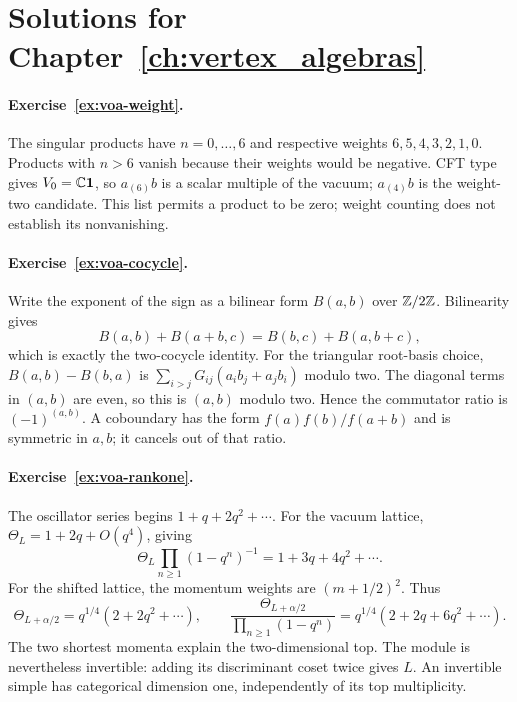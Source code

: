 \section{Solutions for Chapter~\ref{ch:vertex_algebras}}

\paragraph{Exercise~\ref{ex:voa-weight}.}
\label{sol:ex:voa-weight}
The singular products have $n=0,\ldots,6$ and respective weights
$6,5,4,3,2,1,0$. Products with $n>6$ vanish because their
weights would be negative. CFT type gives $V_0=\mathbb C\mathbf1$,
so $a_{(6)}b$ is a scalar multiple of the vacuum; $a_{(4)}b$
is the weight-two candidate. This list permits a product to be
zero; weight counting does not establish its nonvanishing.



\paragraph{Exercise~\ref{ex:voa-cocycle}.}
\label{sol:ex:voa-cocycle}
Write the exponent of the sign as a bilinear form $B(a,b)$
over $\mathbb Z/2\mathbb Z$. Bilinearity gives
\[
 B(a,b)+B(a+b,c)=B(b,c)+B(a,b+c),
\]
which is exactly the two-cocycle identity. For the triangular
root-basis choice, $B(a,b)-B(b,a)$ is
$\sum_{i>j}G_{ij}(a_ib_j+a_jb_i)$ modulo two.
The diagonal terms in $(a,b)$ are even, so this is $(a,b)$
modulo two. Hence the commutator ratio is $(-1)^{(a,b)}$.
A coboundary has the form
$f(a)f(b)/f(a+b)$ and is symmetric in $a,b$; it cancels
out of that ratio.



\paragraph{Exercise~\ref{ex:voa-rankone}.}
\label{sol:ex:voa-rankone}
The oscillator series begins $1+q+2q^2+\cdots$.
For the vacuum lattice, $\Theta_L=1+2q+O(q^4)$, giving
\[
 \Theta_L\prod_{n\ge1}(1-q^n)^{-1}=1+3q+4q^2+\cdots.
\]
For the shifted lattice, the momentum weights are
$(m+1/2)^2$. Thus
\[
 \Theta_{L+\alpha/2}=q^{1/4}(2+2q^2+\cdots),\qquad
 \frac{\Theta_{L+\alpha/2}}{\prod_{n\ge1}(1-q^n)}
 =q^{1/4}(2+2q+6q^2+\cdots).
\]
The two shortest momenta explain the two-dimensional top.
The module is nevertheless invertible: adding its discriminant
coset twice gives $L$. An invertible simple has categorical
dimension one, independently of its top multiplicity.



